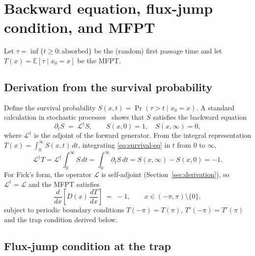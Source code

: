 
\section{Backward equation, flux-jump condition, and MFPT}
\label{sec:backward}

Let $\tau=\inf\{t\ge 0:\text{absorbed}\}$ be the (random) first passage time and
let $T(x)=\mathbb{E}[\tau\mid x_0=x]$ be the MFPT.

\subsection{Derivation from the survival probability}

Define the survival probability $S(x,t)=\Pr(\tau>t\mid x_0=x)$.  A standard
calculation in stochastic processes~\cite{Gardiner2009,Pavliotis2014} shows that
$S$ satisfies the backward equation
\begin{equation}
\partial_t S \;=\; \mathcal{L}^\dagger S, \qquad S(x,0)=1,\quad S(x,\infty)=0,
\label{eq:survival-eq}
\end{equation}
where $\mathcal{L}^\dagger$ is the adjoint of the forward generator.
From the integral representation $T(x)=\int_0^\infty S(x,t)\,dt$, integrating
\eqref{eq:survival-eq} in $t$ from $0$ to $\infty$,
\[
\mathcal{L}^\dagger T
=\mathcal{L}^\dagger\!\int_0^\infty\!S\,dt
=\int_0^\infty\!\partial_t S\,dt
=S(x,\infty)-S(x,0)
=-1.
\]
For Fick's form, the operator $\mathcal{L}$ is self-adjoint
(Section~\ref{sec:derivation}), so $\mathcal{L}^\dagger=\mathcal{L}$ and the
MFPT satisfies
\begin{equation}
{\;
\frac{d}{dx}\!\left[D(x)\,\frac{dT}{dx}\right] \;=\; -1,
\qquad x\in(-\pi,\pi)\setminus\{0\},
\;}
\label{eq:backwardODE}
\end{equation}
subject to periodic boundary conditions $T(-\pi)=T(\pi)$,
$T'(-\pi)=T'(\pi)$ and the trap condition derived below.

\subsection{Flux-jump condition at the trap}

